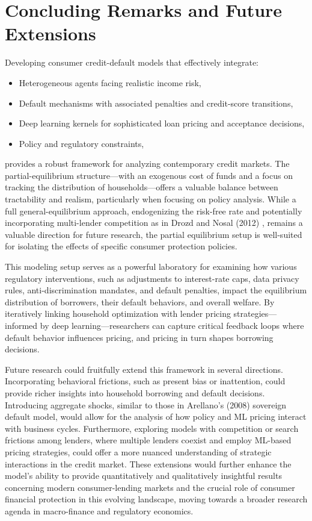 \documentclass[acmsmall]{acmart}
\begin{document}
\section*{Concluding Remarks and Future Extensions}

Developing consumer credit-default models that effectively integrate:
\begin{itemize}
    \item Heterogeneous agents facing realistic income risk,
    \item Default mechanisms with associated penalties and credit-score transitions,
    \item Deep learning kernels for sophisticated loan pricing and acceptance decisions,
    \item Policy and regulatory constraints,
\end{itemize}
provides a robust framework for analyzing contemporary credit markets. The partial-equilibrium structure—with an exogenous cost of funds and a focus on tracking the distribution of households—offers a valuable balance between tractability and realism, particularly when focusing on policy analysis. While a full general-equilibrium approach, endogenizing the risk-free rate and potentially incorporating multi-lender competition as in Drozd and Nosal (2012) \cite{Drozd2012}, remains a valuable direction for future research, the partial equilibrium setup is well-suited for isolating the effects of specific consumer protection policies.

This modeling setup serves as a powerful laboratory for examining how various regulatory interventions, such as adjustments to interest-rate caps, data privacy rules, anti-discrimination mandates, and default penalties, impact the equilibrium distribution of borrowers, their default behaviors, and overall welfare. By iteratively linking household optimization with lender pricing strategies—informed by deep learning—researchers can capture critical feedback loops where default behavior influences pricing, and pricing in turn shapes borrowing decisions.

Future research could fruitfully extend this framework in several directions. Incorporating behavioral frictions, such as present bias or inattention, could provide richer insights into household borrowing and default decisions. Introducing aggregate shocks, similar to those in Arellano’s (2008) sovereign default model, would allow for the analysis of how policy and ML pricing interact with business cycles. Furthermore, exploring models with competition or search frictions among lenders, where multiple lenders coexist and employ ML-based pricing strategies, could offer a more nuanced understanding of strategic interactions in the credit market.  These extensions would further enhance the model's ability to provide quantitatively and qualitatively insightful results concerning modern consumer-lending markets and the crucial role of consumer financial protection in this evolving landscape, moving towards a broader research agenda in macro-finance and regulatory economics.







\end{document}

